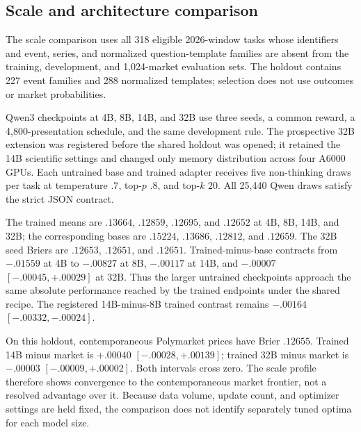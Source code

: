 \subsection{Scale and architecture comparison}
\label{app:exp4-scale}

The scale comparison uses all 318 eligible 2026-window tasks whose identifiers and
event, series, and normalized question-template families are absent from the
training, development, and 1,024-market evaluation sets. The holdout contains 227
event families and 288 normalized templates; selection does not use outcomes or
market probabilities.

Qwen3 checkpoints at 4B, 8B, 14B, and 32B use three seeds, a common reward, a
4,800-presentation schedule, and the same development rule. The prospective 32B
extension was registered before the shared holdout was opened; it retained the
14B scientific settings and changed only memory distribution across four A6000
GPUs. Each untrained base and trained adapter receives five non-thinking draws
per task at temperature $.7$, top-$p$ $.8$, and top-$k$ 20. All 25,440 Qwen
draws satisfy the strict JSON contract.

\begin{center}
\begin{minipage}{.94\linewidth}
\centering
{}
\label{tab:exp4-qwen-scale-results}
\scriptsize
\setlength{\tabcolsep}{3.5pt}
\resizebox{\linewidth}{!}{}
\end{minipage}
\end{center}

The trained means are $.13664$, $.12859$, $.12695$, and $.12652$ at 4B, 8B,
14B, and 32B; the corresponding bases are $.15224$, $.13686$, $.12812$, and
$.12659$. The 32B seed Briers are $.12653$, $.12651$, and $.12651$.
Trained-minus-base contracts from $-.01559$ at 4B to $-.00827$ at 8B,
$-.00117$ at 14B, and $-.00007$ $[-.00045,+.00029]$ at 32B. Thus the larger
untrained checkpoints approach the same absolute performance reached by the
trained endpoints under the shared recipe. The registered 14B-minus-8B trained
contrast remains $-.00164$ $[-.00332,-.00024]$.

On this holdout, contemporaneous Polymarket prices have Brier $.12655$.
Trained 14B minus market is $+.00040$ $[-.00028,+.00139]$; trained 32B minus
market is $-.00003$ $[-.00009,+.00002]$. Both intervals cross zero. The scale
profile therefore shows convergence to the contemporaneous market frontier,
not a resolved advantage over it. Because data volume, update count, and
optimizer settings are held fixed, the comparison does not identify separately
tuned optima for each model size.

